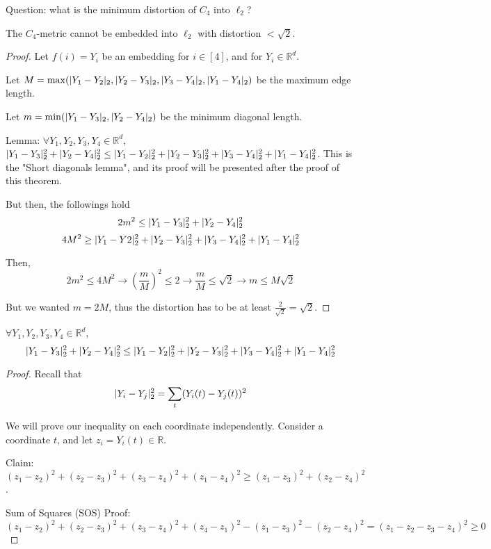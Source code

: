     Question: what is the minimum distortion of $C_4$ into $\ell_2$?

    \begin{theorem}
        The $C_4$-metric cannot be embedded into $\ell_2$ with distortion $< \sqrt{2}$.
    \end{theorem}

    \begin{proof}
        Let $f(i) = Y_i$ be an embedding for $i \in [4]$, and for $Y_i \in \mathbb{R}^d$.

        Let $M = \max (\vert Y_1 - Y_2 \vert_2, \vert Y_2 - Y_3 \vert_2, \vert Y_3 - Y_4 \vert_2, \vert Y_1 - Y_4 \vert_2)$ be the maximum edge length.

        Let $m = \min (\vert Y_1 - Y_3 \vert_2, \vert Y_2 - Y_4 \vert_2)$ be the minimum diagonal length.

        Lemma: $\forall Y_1, Y_2, Y_3, Y_4 \in \mathbb{R}^d$, $\vert Y_1 - Y_3 \vert_2^2 + \vert Y_2 - Y_4 \vert_2^2 \leq \vert Y_1 - Y_2 \vert_2^2 + \vert Y_2 - Y_3 \vert_2^2 + \vert Y_3 - Y_4 \vert_2^2 + \vert Y_1 - Y_4 \vert_2^2$.
        This is the "Short diagonals lemma", and its proof will be presented after the proof of this theorem.

        But then, the followings hold
        \[ 2m^2 \leq \vert Y_1 - Y_3 \vert_2^2 + \vert Y_2 - Y_4 \vert_2^2 \]
        \[ 4M^2 \geq \vert Y_1 - Y2 \vert_2^2 + \vert Y_2 - Y_3 \vert_2^2 + \vert Y_3 - Y_4 \vert_2^2 + \vert Y_1 - Y_4 \vert_2^2 \]

        Then,
        \[ 2m^2 \leq 4M^2 \rightarrow (\frac{m}{M})^2 \leq 2 \rightarrow \frac{m}{M} \leq \sqrt{2} \rightarrow m \leq M \sqrt{2} \]

        But we wanted $m = 2M$, thus the distortion has to be at least $\frac{2}{\sqrt{2}} = \sqrt{2}$.
    \end{proof}

    \begin{lemma}
        $\forall Y_1, Y_2, Y_3, Y_4 \in \mathbb{R}^d$,
        \[ \vert Y_1 - Y_3 \vert_2^2 + \vert Y_2 - Y_4 \vert_2^2 \leq \vert Y_1 - Y_2 \vert_2^2 + \vert Y_2 - Y_3 \vert_2^2 + \vert Y_3 - Y_4 \vert_2^2 + \vert Y_1 - Y_4 \vert_2^2 \]
    \end{lemma}

    \begin{proof}
        Recall that
        \[ \vert Y_i - Y_j \vert_2^2 = \sum_{t} (Y_i(t) - Y_j(t))^2 \]

        We will prove our inequality on each coordinate independently.
        Consider a coordinate $t$, and let $z_i = Y_i(t) \in \mathbb{R}$.

        Claim: $(z_1 - z_2)^2 + (z_2 - z_3)^2 + (z_3 - z_4)^2 + (z_1 - z_4)^2 \geq (z_1 - z_3)^2 + (z_2 - z_4)^2$.

        Sum of Squares (SOS) Proof:
        $(z_1 - z_2)^2 + (z_2 - z_3)^2 + (z_3 - z_4)^2 + (z_4 - z_1)^2 - (z_1 - z_3)^2 - (z_2 - z_4)^2 = (z_1 - z_2 - z_3 - z_4)^2 \geq 0$
    \end{proof}


